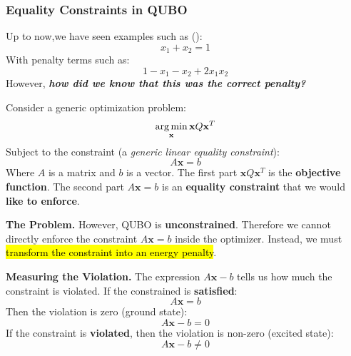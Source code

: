 \subsubsection{Equality Constraints in QUBO}\label{sec:equality-constraints-in-qubo}

Up to now,we have seen examples such as ():
\begin{equation*}
    x_1 + x_2 = 1
\end{equation*}
With penalty terms such as:
\begin{equation*}
    1 - x_1 - x_2 + 2x_1x_2
\end{equation*}
However, \textbf{\emph{how did we know that this was the correct penalty?}}

\highspace
Consider a generic optimization problem:
\begin{equation*}
    \operatorname*{arg\,min}_{\mathbf{x}} \mathbf{x} Q \mathbf{x}^T
\end{equation*}
Subject to the constraint (a \emph{generic linear equality constraint}):
\begin{equation*}
    A\mathbf{x} = b
\end{equation*}
Where $A$ is a matrix and $b$ is a vector. The first part $\mathbf{x} Q \mathbf{x}^T$ is the \textbf{objective function}. The second part $A\mathbf{x} = b$ is an \textbf{equality constraint} that we would \textbf{like to enforce}.

\highspace
\textcolor{Red2}{ \textbf{The Problem.}} However, QUBO is \textbf{unconstrained}. Therefore we cannot directly enforce the constraint $A\mathbf{x} = b$ inside the optimizer. Instead, we must \hl{transform the constraint into an energy penalty}.

\highspace
\textcolor{Green3}{ \textbf{Measuring the Violation.}} The expression $A\mathbf{x} - b$ tells us how much the constraint is violated. If the constrained is \textbf{satisfied}:
\begin{equation*}
    A\mathbf{x} = b
\end{equation*}
Then the violation is zero (ground state):
\begin{equation*}
    A\mathbf{x} - b = 0
\end{equation*}
If the constraint is \textbf{violated}, then the violation is non-zero (excited state):
\begin{equation*}
    A\mathbf{x} - b \neq 0
\end{equation*}

